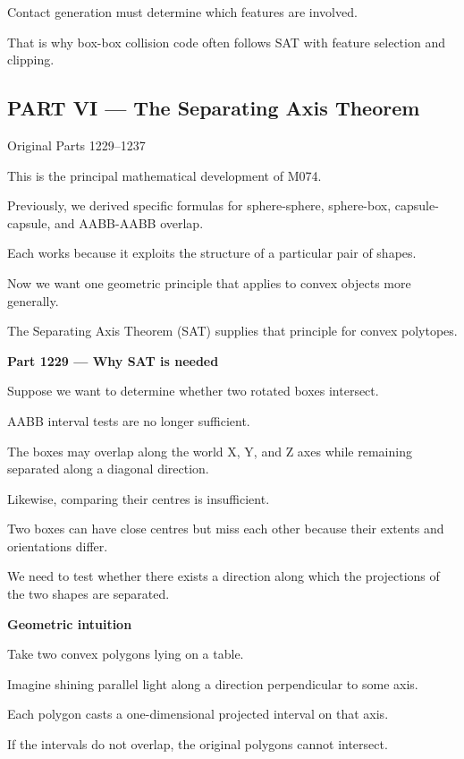 Contact generation must determine which features are involved.

That is why box-box collision code often follows SAT with feature selection and clipping.

\subsection{PART VI --- The Separating Axis Theorem}\label{04-visual-computing-ii-ch024-part-vi-the-separating-axis-theorem}

\hypertarget{04-visual-computing-ii-ch024-part-vi-the-separating-axis-theorem}{}

Original Parts 1229--1237

This is the principal mathematical development of M074.

Previously, we derived specific formulas for sphere-sphere, sphere-box, capsule-capsule, and AABB-AABB overlap.

Each works because it exploits the structure of a particular pair of shapes.

Now we want one geometric principle that applies to convex objects more generally.

The Separating Axis Theorem (SAT) supplies that principle for convex polytopes.

\textbf{Part 1229 --- Why SAT is needed}

Suppose we want to determine whether two rotated boxes intersect.

AABB interval tests are no longer sufficient.

The boxes may overlap along the world X, Y, and Z axes while remaining separated along a diagonal direction.

Likewise, comparing their centres is insufficient.

Two boxes can have close centres but miss each other because their extents and orientations differ.

We need to test whether there exists a direction along which the projections of the two shapes are separated.

\textbf{Geometric intuition}

Take two convex polygons lying on a table.

Imagine shining parallel light along a direction perpendicular to some axis.

Each polygon casts a one-dimensional projected interval on that axis.

If the intervals do not overlap, the original polygons cannot intersect.

